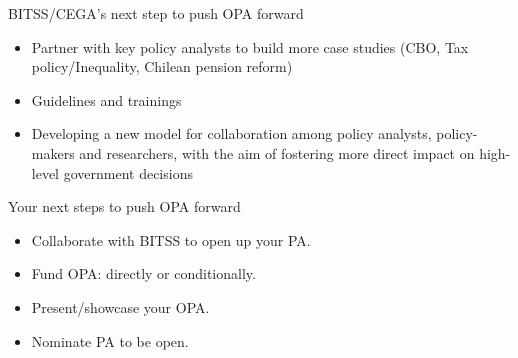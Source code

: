 \documentclass{beamer}
\begin{document}
\begin{frame}{Discussion}

\end{itemize}
\end{frame}

\begin{frame}{BITSS/CEGA's next step to push OPA forward}
\begin{itemize}
\item Partner with key policy analysts to build more case studies (CBO, Tax policy/Inequality, Chilean pension reform)
\item Guidelines and trainings
\item Developing a new model for collaboration among policy analysts, policy-makers and researchers, with the aim of fostering more direct impact on high-level government decisions
\end{itemize}
\end{frame}

\begin{frame}{Your next steps to push OPA forward}
\begin{itemize}
\item Collaborate with BITSS to open up your PA. 
\item Fund OPA: directly or conditionally.
\item Present/showcase your OPA. 
\item Nominate PA to be open. 
\end{itemize}
\end{frame}
\end{document}

